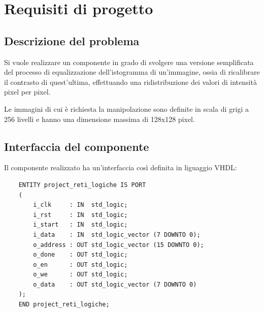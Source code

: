 \documentclass{article}
\begin{document}
\section{Requisiti di progetto} %
\subsection{Descrizione del problema} %
Si vuole realizzare un componente in grado di svolgere una versione semplificata del processo di equalizzazione dell’istogramma di un’immagine, ossia di ricalibrare il contrasto di quest’ultima,
effettuando una ridistribuzione dei valori di intensità pixel per pixel. \par
Le immagini di cui è richiesta la manipolazione sono definite in scala di grigi a 256 livelli e hanno una dimensione massima di 128x128 pixel.
\vspace{0,3cm} %

\subsection{Interfaccia del componente} %
Il componente realizzato ha un’interfaccia così definita in liguaggio VHDL:

\begin{verbatim}
    ENTITY project_reti_logiche IS PORT
	(
		i_clk     : IN  std_logic;
		i_rst     : IN  std_logic; 
		i_start   : IN  std_logic; 
		i_data    : IN  std_logic_vector (7 DOWNTO 0);
		o_address : OUT std_logic_vector (15 DOWNTO 0);
		o_done    : OUT std_logic; 
		o_en      : OUT std_logic;
		o_we      : OUT std_logic;
		o_data    : OUT std_logic_vector (7 DOWNTO 0) 
	);
    END project_reti_logiche;
\end{verbatim}
\vspace{0,3cm} %
\end{document}
